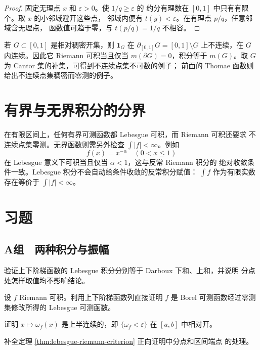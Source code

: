 \begin{proof}
固定无理点 \(x\) 和 \(\varepsilon>0\)。使 \(1/q\ge\varepsilon\) 的
约分有理数在 \([0,1]\) 中只有有限个。取 \(x\) 的小邻域避开这些点，
邻域内便有 \(t(y)<\varepsilon\)。在有理点 \(p/q\)，任意邻域含无理点，
函数值可趋于零，与 \(t(p/q)=1/q\) 不相容。
\end{proof}

\begin{example}[稠密开集的指示函数]
若 \(G\subset[0,1]\) 是相对稠密开集，则
\(\mathbf1_G\) 在 \(\partial_{[0,1]}G=[0,1]\setminus G\) 上不连续，在 \(G\)
内连续。因此它 Riemann 可积当且仅当 \(m(\partial G)=0\)，积分等于
\(m(G)\)。取 \(G\) 为 Cantor 集的补集，可得到不连续点集不可数的例子；
前面的 Thomae 函数则给出不连续点集稠密而零测的例子。
\end{example}

\section{有界与无界积分的分界}

在有限区间上，任何有界可测函数都 Lebesgue 可积，而 Riemann 可积还要求
不连续点集零测。无界函数则需另外检查 \(\int|f|<\infty\)。例如
\[
 f(x)=x^{-\alpha}\quad(0<x\le1)
\]
在 Lebesgue 意义下可积当且仅当 \(\alpha<1\)，这与反常 Riemann 积分的
绝对收敛条件一致。Lebesgue 积分不会自动给条件收敛的反常积分赋值：
\(\int f\) 作为有限实数存在等价于 \(\int|f|<\infty\)。

\section*{习题}
\subsection*{A组　两种积分与振幅}
\begin{enumerate}[label=\textbf{\thechapter.\arabic*.}]
验证上下阶梯函数的 Lebesgue 积分分别等于 Darboux 下和、上和，并说明
分点处怎样取值均不影响结论。

设 \(f\) Riemann 可积。利用上下阶梯函数列直接证明 \(f\) 是 Borel
可测函数经过零测集修改所得的 Lebesgue 可测函数。

证明 \(x\mapsto\omega_f(x)\) 是上半连续的，即
\(\{\omega_f<\varepsilon\}\) 在 \([a,b]\) 中相对开。

补全定理 \ref{thm:lebesgue-riemann-criterion} 正向证明中分点和区间端点
的处理。

\end{enumerate}
